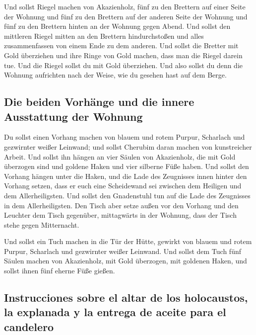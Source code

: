  Und sollst Riegel machen von Akazienholz, fünf zu den
Brettern auf einer Seite der Wohnung  und fünf zu den
Brettern auf der anderen Seite der Wohnung und fünf zu den Brettern
hinten an der Wohnung gegen Abend.  Und sollst den
mittleren Riegel mitten an den Brettern hindurchstoßen und alles
zusammenfassen von einem Ende zu dem anderen.  Und sollst
die Bretter mit Gold überziehen und ihre Ringe von Gold machen, dass man
die Riegel darein tue.  Und die Riegel sollst du mit Gold
überziehen. Und also sollst du denn die Wohnung aufrichten nach der
Weise, wie du gesehen hast auf dem Berge.

\hypertarget{die-beiden-vorhuxe4nge-und-die-innere-ausstattung-der-wohnung}{%
\subsection{Die beiden Vorhänge und die innere Ausstattung der
Wohnung}\label{die-beiden-vorhuxe4nge-und-die-innere-ausstattung-der-wohnung}}

 Du sollst einen Vorhang machen von blauem und rotem
Purpur, Scharlach und gezwirnter weißer Leinwand; und sollst Cherubim
daran machen von kunstreicher Arbeit.  Und sollst ihn
hängen an vier Säulen von Akazienholz, die mit Gold überzogen sind und
goldene Haken und vier silberne Füße haben.  Und sollst
den Vorhang hängen unter die Haken, und die Lade des Zeugnisses innen
hinter den Vorhang setzen, dass er euch eine Scheidewand sei zwischen
dem Heiligen und dem Allerheiligsten.  Und sollst den
Gnadenstuhl tun auf die Lade des Zeugnisses in dem Allerheiligsten.
 Den Tisch aber setze außen vor den Vorhang und den
Leuchter dem Tisch gegenüber, mittagwärts in der Wohnung, dass der Tisch
stehe gegen Mitternacht.

 Und sollst ein Tuch machen in die Tür der Hütte, gewirkt
von blauem und rotem Purpur, Scharlach und gezwirnter weißer Leinwand.
 Und sollst dem Tuch fünf Säulen machen von Akazienholz,
mit Gold überzogen, mit goldenen Haken, und sollst ihnen fünf eherne
Füße gießen.

\hypertarget{instrucciones-sobre-el-altar-de-los-holocaustos-la-explanada-y-la-entrega-de-aceite-para-el-candelero}{%
\subsection{Instrucciones sobre el altar de los holocaustos, la
explanada y la entrega de aceite para el
candelero}\label{instrucciones-sobre-el-altar-de-los-holocaustos-la-explanada-y-la-entrega-de-aceite-para-el-candelero}}

